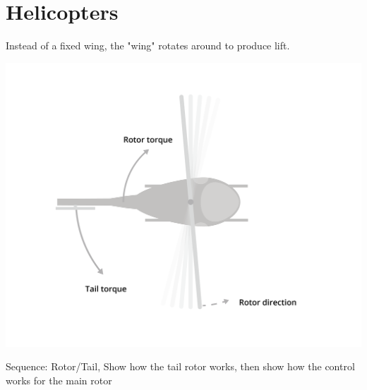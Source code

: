 \chapter{Helicopters}


Instead of a fixed wing, the "wing" rotates around to produce lift.

\includegraphics[width=.75\textwidth]{torque.png}


Sequence: Rotor/Tail, Show how the tail rotor works, then show how the control works for the main rotor

